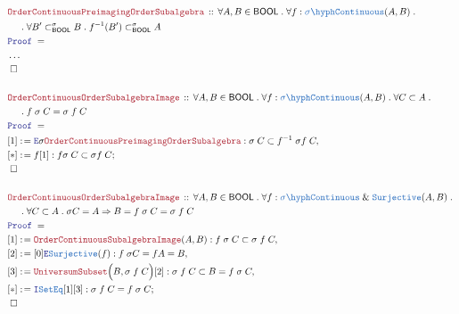 \documentclass[12pt]{scrartcl}
\newcommand{\TYPE}[1]{\textcolor{NavyBlue}{\mathtt{#1}}}
\newcommand{\LOGIC}[1]{\textcolor{Blue}{\mathtt{#1}}}
\newcommand{\THM}[1]{\textcolor{Maroon}{\mathtt{#1}}}
\renewcommand{\.}{\; . \;}
\newcommand{\de}{: \kern 0.1pc =}
\newcommand{\Theorem}[2]{& \THM{#1} \, :: \, #2 \\ & \Proof = \\ }
\newcommand{\NewLine}{\\ & \kern 1pc}
\newcommand{\Page}[1]{ \begin{align*} #1 \end{align*}   }
\newcommand{\NoProof}{ & \ldots \\ \EndProof}
\renewcommand{\And}{\; \& \;}
\newcommand{\Imply}{\Rightarrow}
\newcommand{\Intro}{\LOGIC{I}}
\newcommand{\Elim}{\LOGIC{E}}
\newcommand{\Say}[3]{& #1 \de #2 : #3, \\}
\newcommand{\Conclude}[3]{& #1 \de #2 : #3; \\}
\newcommand{\QED}{\; \square}
\newcommand{\EndProof}{& \QED \\}
\newcommand{\Proof}{\LOGIC{Proof} \; }
\newcommand{\sC}{\TYPE{\sigma\hyph Continuous}}
\newcommand{\BOOL}{\mathsf{BOOL}}
\begin{document}
\Page{
	\Theorem{OrderContinuousPreimagingOrderSubalgebra}
	{
		\forall A,B \in \BOOL \.
		\forall f : \sC(A,B) \.
		\NewLine \. 
		\forall B' \subset_\BOOL^\sigma B \.
		f^{-1}(B') \subset_\BOOL^\sigma A
	}
	\NoProof
	\\
	\Theorem{OrderContinuousOrderSubalgebraImage}
	{
		\forall A,B \in \BOOL \.
		\forall f : \sC(A,B) \.
		\forall C \subset A \.
		\NewLine \. 
		f\;\sigma \; C =  \sigma \; f \; C
	}
	\Say{[1]}{\Elim \sigma \THM{OrderContinuousPreimagingOrderSubalgebra}}
	{
		\sigma \;C \subset f^{-1} \; \sigma f \; C
	}
	\Conclude{[*]}{f[1]}
	{
		f \sigma \; C \subset \sigma f \; C
	}
	\EndProof
	\\
	\Theorem{OrderContinuousOrderSubalgebraImage}
	{
		\forall A,B \in \BOOL \.
		\forall f : \sC \And \TYPE{Surjective}(A,B) \.
		\NewLine \.
		\forall C \subset A \.
		\sigma C = A
		\Imply
		B = f\;\sigma \; C =  
		\sigma \; f \; C 
	}
	\Say{[1]}{\THM{OrderContinuousSubalgebraImage}(A,B)}
	{
		f \; \sigma \; C \subset \sigma \; f \; C 
	}
	\Say{[2]}{[0]\Elim \TYPE{Surjective}(f)}{ f \; \sigma C =  f A = B}
	\Say{[3]}{\THM{UniversumSubset}\Big( B, \sigma \; f \; C \Big)[2]}
	{
		\sigma \; f \; C \subset B =  f \; \sigma \; C
	}
	\Conclude{[*]}{\Intro \TYPE{SetEq}[1][3]}
	{
		\sigma \; f \; C = f \; \sigma \; C
	}
	\EndProof
}
\end{document}
